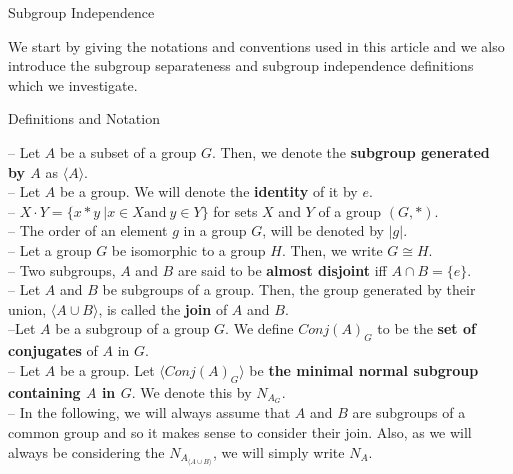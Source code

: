 \documentclass{article}
\begin{document}
	
	\begin{section}{Subgroup Independence}
		
		We start by giving the notations and conventions used in this article and we also introduce the subgroup separateness and subgroup independence definitions which we investigate.
		
		\begin{subsection}{\large Definitions and Notation}	\normalfont
			
			\noindent -- Let $A$ be a subset of a group $G$. Then, we denote the \textbf{subgroup generated by $A$} as \textbf{$\langle A\rangle $}.\\
			
			\noindent -- Let $A$ be a group. We will denote the \textbf{identity} of it by $e$.\\
			
			\noindent  -- $ X \cdot Y = \{x * y \  | x \in X \text{and} \ y \in Y\}$ for sets $X$ and $Y$ of a group $(G, *)$.\\
			
			\noindent -- The order of an element $g$ in a group $G$, will be denoted by $|g|$.\\
			
			\noindent -- Let a group $G$ be isomorphic to a group $H$. Then, we write $G \cong H$.\\
			
			
			\noindent -- Two subgroups, $A$ and $B$ are said to be \textbf{almost disjoint} iff $A \cap B = \{e\}$.\\
			
			\noindent -- Let $A$ and $B$ be subgroups of a group. Then, the group generated by their union, $\langle A \cup B\rangle $, is called the \textbf{join} of $A$ and $B$.\\
			
			\noindent --Let $A$ be a subgroup of a group $G$. We define $Conj(A)_{G}$ to be the\textbf{ set of conjugates} of $A$ in $G$.\\
			
			\noindent -- Let $A$ be a  group. Let \textbf{$\langle Conj(A)_G\rangle $} be \textbf{the minimal normal subgroup containing $A$ in $G$}. We  denote  this by $N_{A_G}$.\\
			
			
			
			\noindent -- In the following, we will always assume that $A$ and $B$ are subgroups of a common group and so it makes sense to consider their join. Also, as we will always be considering the $N_{A_{ \langle A \cup B\rangle }}$, we will simply write {\textbf{$N_A$}}.\\
			

\end{subsection}
\end{section}
\end{document}
